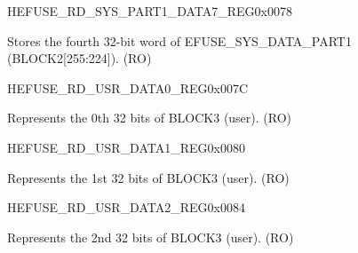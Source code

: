 \begin{register}{H}{EFUSE\_RD\_SYS\_PART1\_DATA7\_REG}{0x0078}\label{regdesc:EFUSERDSYSPART1DATA7REG}
%
\regnewline%
\begin{regdesc}\begin{reglist}
\label{fielddesc:EFUSESYSDATAPART17}\item [EFUSE\_SYS\_DATA\_PART1\_7] Stores the fourth 32-bit word of EFUSE\_SYS\_DATA\_PART1 (BLOCK2[255:224]). (RO)
\end{reglist}\end{regdesc}
\end{register}


\begin{register}{H}{EFUSE\_RD\_USR\_DATA0\_REG}{0x007C}\label{regdesc:EFUSERDUSRDATA0REG}
%
\regnewline%
\begin{regdesc}\begin{reglist}
\label{fielddesc:EFUSEUSRDATA0}\item [EFUSE\_USR\_DATA0] Represents the 0th 32 bits of BLOCK3 (user). (RO)
\end{reglist}\end{regdesc}
\end{register}


\begin{register}{H}{EFUSE\_RD\_USR\_DATA1\_REG}{0x0080}\label{regdesc:EFUSERDUSRDATA1REG}
%
\regnewline%
\begin{regdesc}\begin{reglist}
\label{fielddesc:EFUSEUSRDATA1}\item [EFUSE\_USR\_DATA1] Represents the 1st 32 bits of BLOCK3 (user). (RO)
\end{reglist}\end{regdesc}
\end{register}


\begin{register}{H}{EFUSE\_RD\_USR\_DATA2\_REG}{0x0084}\label{regdesc:EFUSERDUSRDATA2REG}
%
\regnewline%
\begin{regdesc}\begin{reglist}
\label{fielddesc:EFUSEUSRDATA2}\item [EFUSE\_USR\_DATA2] Represents the 2nd 32 bits of BLOCK3 (user). (RO)
\end{reglist}\end{regdesc}
\end{register}



